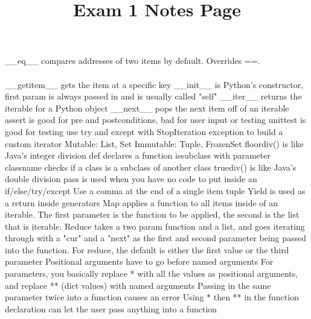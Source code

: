 \documentclass{article}
\title{Exam 1 Notes Page}
\author{}
\date{}
\begin{document}
\begin{multicols}{3}

\_\_eq\_\_ compares addresses of two items by default. Overrides ==.\\\\
\_\_getitem\_\_ gets the item at a specific key
\_\_init\_\_ is Python's constructor, first param is always passed in and is usually called "self"
\_\_iter\_\_ returns the iterable for a Python object
\_\_next\_\_ pops the next item off of an iterable
assert is good for pre and postconditions, bad for user input or testing
unittest is good for testing
use try and except with StopIteration exception to build a custom iterator
Mutable: List, Set
Immutable: Tuple, FrozenSet
floordiv() is like Java's integer division
def declares a function
issubclass with parameter classname checks if a class is a subclass of another class
truediv() is like Java's double division
pass is used when you have no code to put inside an if/else/try/except
Use a comma at the end of a single item tuple
Yield is used as a return inside generators
Map applies a function to all items inside of an iterable. The first parameter is the function to be applied, the second is the list that is iterable.
Reduce takes a two param function and a list, and goes iterating through with a "cur" and a "next" as the first and second parameter being passed into the function.
For reduce, the default is either the first value or the third parameter
Positional arguments have to go before named arguments
For parameters, you basically replace * with all the values as positional arguments, and replace ** (dict values) with named arguments
Passing in the same parameter twice into a function causes an error
Using * then ** in the function declaration can let the user pass anything into a function

\end{multicols}
\end{document}
